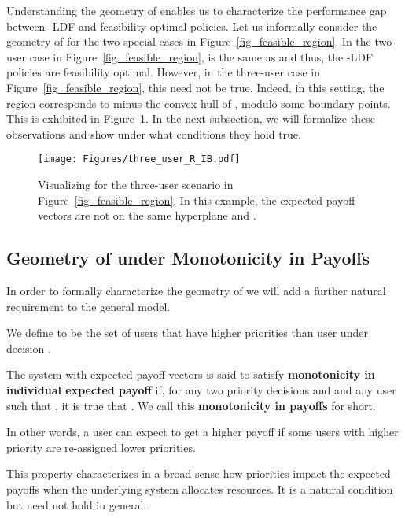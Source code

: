 \documentclass[prodmode,acmtompecs]{acmsmall}
\newcommand{\priorityImplication}{monotonicity in individual expected payoff}
\newcommand{\myComments}[1]{}
\newif\ifdissertation
\newcommand{\dissertationStart}{\ifdissertation  \myComments{Dissertation version: }}
\newcommand{\commentEnd}{\myComments{End}}
\newcommand{\add}[1]{#1}
\begin{document}
\dissertationStart
In other words,  and is feasible under the -LDF policy if there is a weight vector  such that for any subset of users , by giving users in  the highest priorities, the weighted sum of payoff requirement  will not exceed the least sum weighted payoff . 
\commentEnd\fi

Understanding the geometry of  enables us to characterize the performance gap between -LDF and feasibility optimal policies. 
Let us informally consider the geometry of  for the two special cases in Figure~{\ref{fig_feasible_region}}. 
In the two-user case in Figure~{\ref{fig_feasible_region}},  is the same as  and thus, the -LDF policies are feasibility optimal. 
However, in the three-user case in Figure~{\ref{fig_feasible_region}}, this need not be true. 
Indeed, in this setting, the region  corresponds to  minus the convex hull of , modulo some boundary points. 
This is exhibited in Figure~{\ref{fig_three_user_R_IB}}. 
In the next subsection, we will formalize these observations and show under what conditions they hold true. 

\begin{figure}[htp]
  \centering
  \texttt{[image: Figures/three\_user\_R\_IB.pdf]}
  \caption{Visualizing  for the three-user scenario in Figure~{\ref{fig_feasible_region}}. \add{In this example, the expected payoff vectors  are not on the same hyperplane} and . }
  \label{fig_three_user_R_IB}
\end{figure}

\subsection{Geometry of  under Monotonicity in Payoffs}
\label{subsection_characterizing_R_IB}

In order to formally characterize the geometry of  we will add a further natural requirement to the general model. 


We define  to be the set of users that have higher priorities than user  under decision . 

\begin{definition}
The system with expected payoff vectors  is said to satisfy {\bf \priorityImplication} if, for any two priority decisions  and  and any user  such that , it is true that . We call this {\bf monotonicity in payoffs} for short. 
\end{definition}

In other words, a user  can expect to get a higher payoff if some users with higher priority are re-assigned lower priorities. 
\dissertationStart
Note we are not comparing the expected payoffs of different users since payoffs can be defined in different ways for different users and may not be comparable. 
\commentEnd\fi
This property characterizes in a broad sense how priorities impact the expected payoffs when the underlying system allocates resources. 
It is a natural condition but need not hold in general. 
\end{document}
